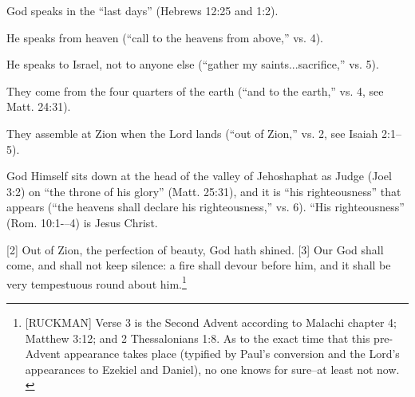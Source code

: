 {\begin{compactenum}
	\item God speaks in the ``last days'' (Hebrews 12:25 and 1:2).
	\item He speaks from heaven (``call to the heavens from above,” vs. 4).
	\item He speaks to Israel, not to anyone else (``gather my saints...sacrifice,” vs. 5).
	\item They come from the four quarters of the earth (``and to the earth,'' vs. 4, see Matt. 24:31).
	\item They assemble at Zion when the Lord lands (``out of Zion,” vs. 2, see Isaiah 2:1--5).
	\item God Himself sits down at the head of the valley of Jehoshaphat as Judge (Joel 3:2) on ``the throne of his glory'' (Matt. 25:31), and it is ``his righteousness'' that appears (``the heavens shall declare his righteousness,” vs. 6). ``His righteousness'' (Rom. 10:1-–4) is Jesus Christ.
\end{compactenum}
}
[2] \textcolor[rgb]{0.00,0.00,1.00}{Out of Zion, the perfection of beauty, God hath shined.}
[3] \textcolor[rgb]{0.00,0.00,1.00}{Our God shall come, and shall not keep silence: a fire shall devour before him, and it shall be very tempestuous round about him.}\footnote{[RUCKMAN] Verse 3 is the Second Advent according to Malachi chapter 4; Matthew 3:12; and 2 Thessalonians 1:8. As to the exact time that this pre-Advent appearance takes place (typified by Paul’s conversion and the Lord’s appearances to Ezekiel and Daniel), no one knows for sure--at least not now. \cite{Ruckman1992Psalms} }
